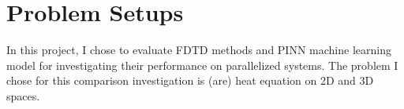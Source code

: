 \section{Problem Setups}
In this project, I chose to evaluate FDTD methods and PINN machine learning model for 
investigating their performance on parallelized systems. 
The problem I chose for this comparison investigation is (are) heat equation on 2D and 3D spaces.

\subsection{}


